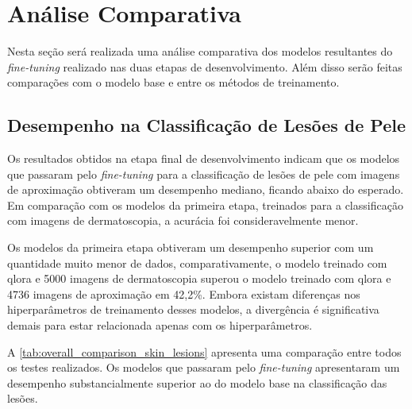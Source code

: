 \section{Análise Comparativa}

Nesta seção será realizada uma análise comparativa dos modelos resultantes do \textit{fine-tuning} realizado nas duas
etapas de desenvolvimento. Além disso serão feitas comparações com o modelo base e entre os métodos de treinamento.

\subsection{Desempenho na Classificação de Lesões de Pele}

Os resultados obtidos na etapa final de desenvolvimento indicam que os modelos que passaram pelo \textit{fine-tuning}
para a classificação de lesões de pele com imagens de aproximação obtiveram um desempenho mediano, ficando abaixo do
esperado. Em comparação com os modelos da primeira etapa, treinados para a classificação com imagens de dermatoscopia,
a
acurácia foi consideravelmente menor.

Os modelos da primeira etapa obtiveram um desempenho superior com um quantidade muito menor de dados, comparativamente,
o modelo treinado com \ac{qlora} e 5000 imagens de dermatoscopia superou o modelo treinado com \ac{qlora} e 4736
imagens de aproximação em 42,2\%. Embora existam diferenças nos hiperparâmetros de treinamento desses modelos, a
divergência é significativa demais para estar relacionada apenas com os hiperparâmetros.

A \autoref{tab:overall_comparison_skin_lesions} apresenta uma comparação entre todos os testes realizados. Os modelos
que passaram pelo \textit{fine-tuning} apresentaram um desempenho substancialmente superior ao do modelo base na
classificação das lesões.

\clearpage

